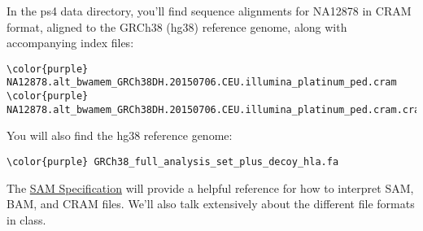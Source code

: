 \documentclass[12pt]{article}
\begin{document}
In the ps4 data directory, you'll find sequence alignments for NA12878 in CRAM format, aligned to the GRCh38 (hg38) reference genome, along with accompanying index files:

\begin{Verbatim}[commandchars=\\\{\}]
\color{purple} NA12878.alt_bwamem_GRCh38DH.20150706.CEU.illumina_platinum_ped.cram
\color{purple} NA12878.alt_bwamem_GRCh38DH.20150706.CEU.illumina_platinum_ped.cram.crai
\end{Verbatim}

You will also find the hg38 reference genome:
\begin{Verbatim}[commandchars=\\\{\}]
\color{purple} GRCh38_full_analysis_set_plus_decoy_hla.fa
\end{Verbatim}

The \href{https://samtools.github.io/hts-specs/SAMv1.pdf}{SAM Specification} will provide a helpful reference for how to interpret SAM, BAM, and CRAM files. We'll also talk extensively about the different file formats in class.
\end{document}
